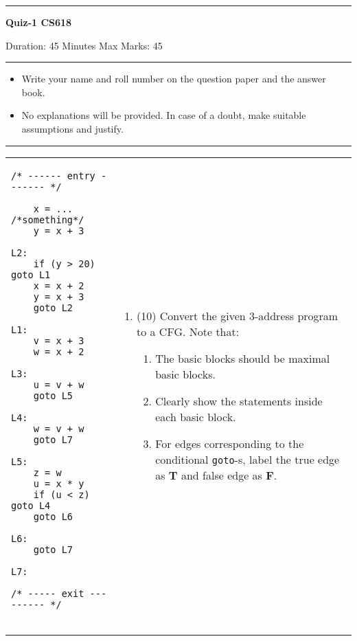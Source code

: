 \documentclass[11pt,draft]{article}
\begin{document}
\noindent \rule{\textwidth}{.2mm}
\begin{center}
{\large {\bf Quiz-1 CS618} }

Duration: 45 Minutes \hfill Max Marks: 45
\end{center} 
\noindent \rule{\textwidth}{.2mm}
\begin{itemize}
\item Write your name and roll number on the question paper and the
  answer book.
\item No explanations will be provided. In case of a doubt, make
  suitable assumptions and justify.
\end{itemize}
\noindent \rule{\textwidth}{.2mm}

\noindent\begin{tabular}{|l|@{}l}%
\begin{minipage}[t]{.33\textwidth}
\begin{verbatim}
/* ------ entry ------- */

    x = ... /*something*/
    y = x + 3

L2:
    if (y > 20) goto L1
    x = x + 2
    y = x + 3
    goto L2

L1:
    v = x + 3
    w = x + 2

L3:  
    u = v + w
    goto L5

L4:
    w = v + w
    goto L7

L5:
    z = w
    u = x * y
    if (u < z) goto L4
    goto L6
    
L6:
    goto L7

L7:

/* ----- exit --------- */
    
\end{verbatim}
\end{minipage}&
\begin{minipage}[t]{.63\textwidth}
  \begin{enumerate}
  \item (10) Convert the given 3-address program to a CFG. Note that:
    \begin{enumerate}
    \item The basic blocks should be maximal basic blocks.
    \item Clearly show the statements inside each basic block.
    \item For edges corresponding to the conditional {\tt goto}-s,
      label the true edge as {\bf T} and false edge as {\bf F}.
    \end{enumerate}
    

\end{enumerate}
\end{minipage}
\end{tabular}
\end{document}
